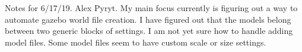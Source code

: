 \documentclass[10pt,a4paper]{article}
\begin{document}
Notes for 6/17/19. Alex Pyryt.
My main focus currently is figuring out a way to automate gazebo world file creation.
I have figured out that the models belong between two generic blocks of settings.
I am not yet sure how to handle adding model files. Some model files seem to have custom scale or size settings. 
\end{document}
